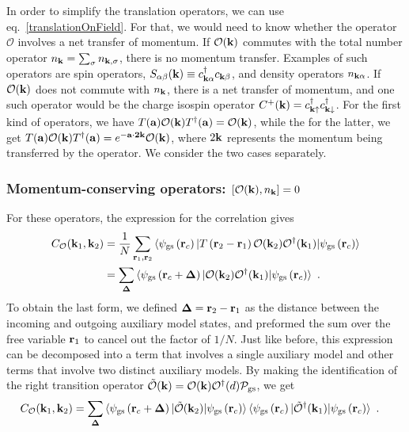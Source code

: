 \documentclass[reprint,hidelinks,onecolumn]{revtex4-2}
\begin{document}
In order to simplify the translation operators, we can use eq.~\ref{translationOnField}. For that, we would need to know whether the operator \(\mathcal{O}\) involves a net transfer of momentum. If \(\mathcal{O}({\bf k})\) commutes with the total number operator \(n_{\bf k} = \sum_\sigma n_{{\bf k},\sigma}\), there is no momentum transfer. Examples of such operators are spin operators, \(S_{\alpha\beta}({\bf k}) \equiv c^\dagger_{{\bf k \alpha}}c_{{\bf k}\beta}\), and density operators \(n_{{\bf k}\alpha}\). If \(\mathcal{O}({\bf k})\) does not commute with \(n_{\bf k}\), there is a net transfer of momentum, and one such operator would be the charge isospin operator \(C^+({\bf k}) = c^\dagger_{{\bf k}\uparrow}c^\dagger_{{\bf k}\downarrow}\). For the first kind of operators, we have \(T({\bf a})\mathcal{O}({\bf k})T^\dagger({\bf a}) = \mathcal{O}({\bf k})\), while the for the latter, we get \(T({\bf a})\mathcal{O}({\bf k})T^\dagger({\bf a}) = e^{-{\bf a}\cdot{\bf 2k}}\mathcal{O}({\bf k})\), where \(2{\bf k}\) represents the momentum being transferred by the operator. We consider the two cases separately.

\subsubsection{Momentum-conserving operators: \(\left[\mathcal{O}({\bf k}), n_{{\bf k}}\right] = 0\)}
For these operators, the expression for the correlation gives
\begin{equation}\begin{aligned}
	C_{\mathcal{O}}({\bf k}_1,{\bf k}_2) &= \frac{1}{N}\sum_{{\bf r}_1,{\bf r}_2}\braket{\psi_\text{gs}\left({\bf r}_c\right) | T\left({\bf r}_2 - {\bf r}_1\right) \mathcal{O}({\bf k}_2)\mathcal{O}^\dagger({\bf k}_1) | \psi_\text{gs}\left({\bf r}_c\right)}\\
										 &=\sum_{{\bf \Delta}}\braket{\psi_\text{gs}\left({\bf r}_c + {\bf \Delta}\right) | \mathcal{O}({\bf k}_2)\mathcal{O}^\dagger({\bf k}_1) | \psi_\text{gs}\left({\bf r}_c\right)}~.
\end{aligned}\end{equation}
To obtain the last form, we defined \({\bf \Delta}={\bf r}_2 - {\bf r}_1\) as the distance between the incoming and outgoing auxiliary model states, and preformed the sum over the free variable \({\bf r}_1\) to cancel out the factor of \(1/N\). Just like before, this expression can be decomposed into a term that involves a single auxiliary model and other terms that involve two distinct auxiliary models. By making the identification of the right transition operator \(\mathcal{\tilde O}({\bf k}) = \mathcal{O}({\bf k})\mathcal{O}^\dagger(d)\mathcal{P}_\text{gs}\), we get
\begin{equation}\begin{aligned}\label{kspaceCorrelation}
C_{\mathcal{O}}({\bf k}_1,{\bf k}_2) &= \sum_{{\bf \Delta}}\braket{\psi_\text{gs}\left({\bf r}_c + {\bf \Delta}\right) | \mathcal{\tilde O}({\bf k}_2) | \psi_\text{gs}\left({\bf r}_c\right)}\braket{\psi_\text{gs}\left({\bf r}_c\right) | \mathcal{\tilde O}^\dagger({\bf k}_1) | \psi_\text{gs}\left({\bf r}_c\right)}~.
\end{aligned}\end{equation}
\end{document}
